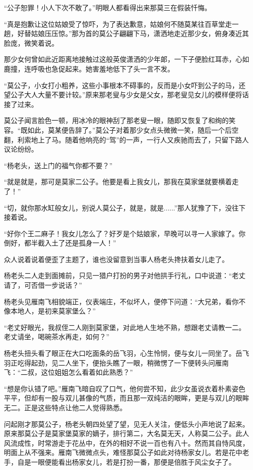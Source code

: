 “公子恕罪！小人下次不敢了。”明眼人都看得出来那莫三在假装忏悔。

“真是抱歉让这位姑娘受了惊吓，为了表达歉意，姑娘何不随莫某往百草堂走一趟，好替姑娘压压惊。”那为首的莫公子翩翩下马，潇洒地走近那少女，俯身凑近其脸庞，微笑着说。

那少女何曾如此近距离地接触过这般英俊潇洒的少年郞，一下子便脸红耳赤，心如鹿撞，连呼吸也急促起来。她害羞地低下了头一言不发。

“莫公子，小女打小粗养，这些小事根本不碍事的，反而是小女吓到公子的马，还望公子大人大量不要计较。”原来那老叟与少女是父女，那老叟见女儿的模样便将话接了过来。

莫公子闻言脸色一顿，用冰冷的眼神刮了那老叟一眼，随即又恢复了和绚的笑容。“既如此，莫某便告辞了。”莫公子对着那少女点头微微一笑，随后一个后空翻，利索地上了马。随着他响亮的“驾”的一声，一行人又疾驰而去了，只留下路人议论纷纷。

“杨老头，送上门的福气你都不要？”

“就是就是，那可是莫家二公子。他要是看上我女儿，那我在莫家堡就要横着走了！”

“切，就你那水缸般女儿，别说人莫公子，就是，就是......”那人犹豫了下，没往下接着说。

“好你个王二麻子！我女儿怎么了？好歹是个姑娘家，早晚可以寻一人家嫁了。你倒好，都半截入土了还是孤身一人！”

众人说着说着便歪了主题了，谁也没留意到当事人杨老头搀扶着女儿走了。

杨老头二人走到面摊前，只见一猎户打扮的男子对他拱手行礼，口中说道：“老丈请了，可否借一步说话？”

杨老头见雁南飞相貌端正，仪表端庄，不似坏人，便停下问道：“大兄弟，看你不像本地人，是初来莫家堡么？”

“老丈好眼光，我叔侄二人刚到莫家堡，对此地人生地不熟，想跟老丈请教一二。老丈请坐，喝碗茶水再走，如何？”

杨老头扭头看了眼正在大口吃面条的岳飞羽，心生怜悯，便与女儿一同坐了。岳飞羽正吃得起劲，见二人坐下，便抬头瞧了一眼，稍微愣了一下便转头问雁南飞：“二叔，这位姐姐怎么看着如此熟悉？”

“想是你认错了吧。”雁南飞暗自叹了口气，他何尝不知，此少女虽说衣着朴素姿色平平，但却有一股与双儿甚像的气质，而且那一双纯洁的眼眸，更是与双儿的眼眸无二。正是这些特点让他二人觉得熟悉。

问起刚才那莫公子，杨老头朝四处望了望，见无人关注，便低头小声地说了起来。原来那莫公子是莫家堡莫家的嫡子，排行第二，大名莫无天，人称莫二公子。此人风流成性，时常游走于花丛中，在外的相好不说一百也有八十。然而其自恃风度，明面上从不强来。雁南飞微微点头，难怪那莫公子如此对待杨家女儿。若是花中老手，自是一眼便能看出杨家女儿，若是打扮一番，那便是倍胜于风尘女子了。

